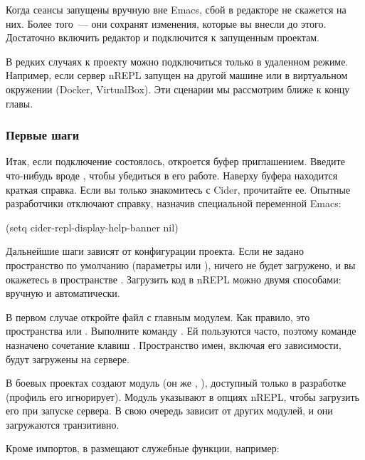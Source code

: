 Когда сеансы запущены вручную вне Emacs, сбой в редакторе не скажется на них. Более того~--- они сохранят изменения, которые вы внесли до этого. Достаточно включить редактор и подключится к запущенным проектам.

В редких случаях к проекту можно подключиться только в удаленном режиме. Например, если сервер nREPL запущен на другой машине или в виртуальном окружении (Docker, VirtualBox). Эти сценарии мы рассмотрим ближе к концу главы.

\subsubsection{Первые шаги}

Итак, если подключение состоялось, откроется буфер  приглашением. Введите что-нибудь вроде , чтобы убедиться в его работе. Наверху буфера находится краткая справка. Если вы только знакомитесь с Cider, прочитайте ее. Опытные разработчики отключают справку, назначив  специальной переменной Emacs:

\begin{english}
  \begin{lisp}
(setq cider-repl-display-help-banner nil)
  \end{lisp}
\end{english}

Дальнейшие шаги зависят от конфигурации проекта. Если не задано пространство по умолчанию (параметры  или  \arr {}), ничего не будет загружено, и вы окажетесь в пространстве . Загрузить код в nREPL можно двумя способами: вручную и автоматически.

В первом случае откройте файл с главным модулем. Как правило, это пространства  или . Выполните команду . Ей пользуются часто, поэтому команде назначено сочетание клавиш . Пространство имен, включая его зависимости, будут загружены на сервере.

В боевых проектах создают модуль  (он же , ), доступный только в разработке (профиль  его игнорирует). Модуль указывают в опциях nREPL, чтобы загрузить его при запуске сервера. В свою очередь  зависит от других модулей, и они загружаются транзитивно.

Кроме импортов, в  размещают служебные функции, например:

